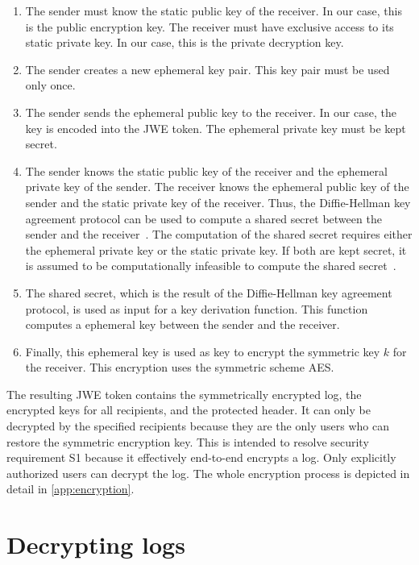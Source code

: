 \documentclass[../main.tex]{subfiles}
\begin{document}
\begin{enumerate}
    \item 
    The sender must know the static public key of the receiver. 
    In our case, this is the public encryption key.
    The receiver must have exclusive access to its static private key.
    In our case, this is the private decryption key.
    \item 
    The sender creates a new ephemeral key pair. 
    This key pair must be used only once.
    \item 
    The sender sends the ephemeral public key to the receiver.
    In our case, the key is encoded into the JWE token.
    The ephemeral private key must be kept secret.
    \item 
    The sender knows the static public key of the receiver and the ephemeral private key of the sender.
    The receiver knows the ephemeral public key of the sender and the static private key of the receiver.
    Thus, the Diffie-Hellman key agreement protocol can be used to compute a shared secret between the sender and the receiver~\cite[438]{Eckert2018}.
    The computation of the shared secret requires either the ephemeral private key or the static private key.
    If both are kept secret, it is assumed to be computationally infeasible to compute the shared secret~\cite[438]{Eckert2018}.
    \item 
    The shared secret, which is the result of the Diffie-Hellman key agreement protocol, is used as input for a key derivation function.
    This function computes a ephemeral key between the sender and the receiver.
    \item 
    Finally, this ephemeral key is used as key to encrypt the symmetric key $k$ for the receiver.
    This encryption uses the symmetric scheme AES.
\end{enumerate}


The resulting JWE token contains the symmetrically encrypted log, the encrypted keys for all recipients, and the protected header.
It can only be decrypted by the specified recipients because they are the only users who can restore the symmetric encryption key.
This is intended to resolve security requirement S1 because it effectively end-to-end encrypts a log.
Only explicitly authorized users can decrypt the log.
The whole encryption process is depicted in detail in \cref{app:encryption}.

\section{Decrypting logs}\label{sec:decrypting}
\end{document}
